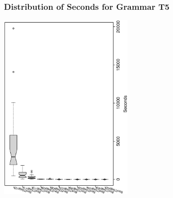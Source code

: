  \begin{frame}
 \frametitle{ Distribution of Seconds for Grammar T5 }
 \begin{center}
\includegraphics[width=0.5\textwidth, angle=-90]
{ExpFboxplottSeconds011.eps}
 \end{center}
 \label{ExpFboxplottSeconds011.eps}  
 \end{frame}


